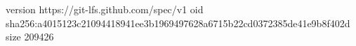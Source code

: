 version https://git-lfs.github.com/spec/v1
oid sha256:a4015123c21094418941ee3b1969497628a6715b22cd0372385de41e9b8f402d
size 209426

